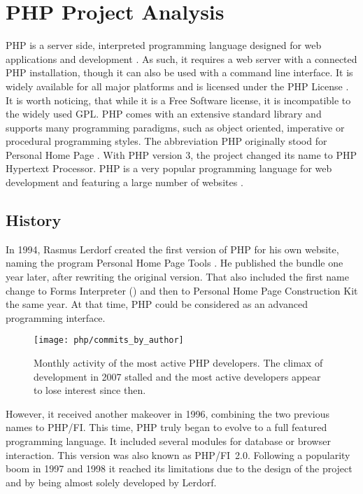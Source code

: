 \section{PHP Project Analysis} %


PHP is a server side, interpreted programming language designed for web
applications and development \cite{PHPIntro}. As such, it requires a web server
with a connected PHP installation, though it can also be used with a command
line interface. It is widely available for all major platforms and is licensed
under the PHP License \cite{PHPManual}. It is worth noticing, that while it is
a Free Software license, it is incompatible to the widely used \ac{GPL}. PHP
comes with an extensive standard library and supports many programming
paradigms, such as object oriented, imperative or procedural programming
styles. The abbreviation PHP originally stood for Personal Home Page
\cite{PHPHistory}. With PHP version 3, the project changed its name to PHP
Hypertext Processor. PHP is a very popular programming language for web
development and featuring a large number of websites
\cite{PHPW3Techs,PHPStats}.

\subsection{History} %

In 1994, Rasmus Lerdorf created the first version of PHP for his own website,
naming the program Personal Home Page Tools \cite{PHPHistory}. He published the
bundle one year later, after rewriting the original version. That also included
the first name change to Forms Interpreter () and then to
Personal Home Page Construction Kit the same year. At that time, PHP could be
considered as an advanced programming interface.

\begin{figure}[htbp]
  \centering
  \texttt{[image: php/commits\_by\_author]}
  \caption[Commits by Most Active Authors, PHP]
  {Monthly activity of the most active PHP developers. The climax of
    development in 2007 stalled and the most active developers appear to lose
    interest since then.}
\end{figure}

However, it received another makeover in 1996, combining the two previous names
to PHP/FI. This time, PHP truly began to evolve to a full featured programming
language. It included several modules for database or browser interaction. This
version was also known as PHP/FI~2.0. Following a popularity boom in 1997 and
1998 it reached its limitations due to the design of the project and by being
almost solely developed by Lerdorf.

